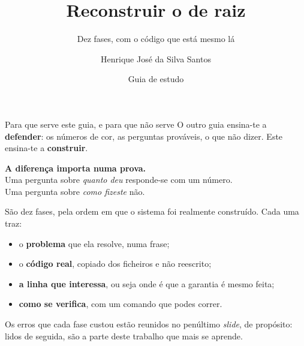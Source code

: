 \documentclass[aspectratio=169]{beamer}
\title[Guia de construção]{Reconstruir o \gator{} de raiz}
\subtitle{\normalsize Dez fases, com o código que está mesmo lá}
\author[H.\ Santos]{Henrique José da Silva Santos}
\institute[ISEP]{MEIA, Instituto Superior de Engenharia do Porto}
\date{\footnotesize Guia de estudo}
\begin{document}
\begin{frame}\titlepage\end{frame}

\begin{frame}{Para que serve este guia, e para que não serve}
\small
O outro guia ensina-te a \textbf{defender}: os números de cor, as perguntas prováveis, o que não
dizer. Este ensina-te a \textbf{construir}.
\vspace{2mm}

\begin{center}
\textbf{A diferença importa numa prova.}\\
Uma pergunta sobre \emph{quanto deu} responde-se com um número.\\
Uma pergunta sobre \emph{como fizeste} não.
\end{center}
\vspace{3mm}

São dez fases, pela ordem em que o sistema foi realmente construído. Cada uma traz:
\vspace{1mm}
\begin{itemize}\small
  \item o \textbf{problema} que ela resolve, numa frase;
  \item o \textbf{código real}, copiado dos ficheiros e não reescrito;
  \item \textbf{a linha que interessa}, ou seja onde é que a garantia é mesmo feita;
  \item \textbf{como se verifica}, com um comando que podes correr.
\end{itemize}
\vspace{2mm}

{\footnotesize Os erros que cada fase custou estão reunidos no penúltimo \emph{slide}, de
propósito: lidos de seguida, são a parte deste trabalho que mais se aprende.}
\end{frame}
\end{document}
